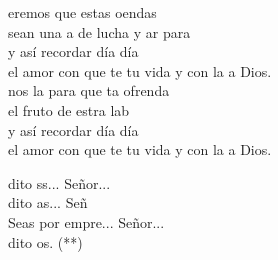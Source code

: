 \begin{cancion}%
	eremos que estas oendas \\
	sean una a de lucha y ar para  \\
	y así recordar día día \\
	el amor con que te tu vida y con la a Dios.\\
	\jump
	nos la  para que ta ofrenda \\
	 el fruto de estra lab \\
	y así recordar día día \\
	el amor con que te tu vida y con la a Dios.\jump\\
	\begin{chorus}%
		dito ss... Señor...\\
		dito as... Señ\\
		Seas por empre... Señor...\\
		dito os. (**)\jump\\
	\end{chorus}%
	\jump
\end{cancion}%
